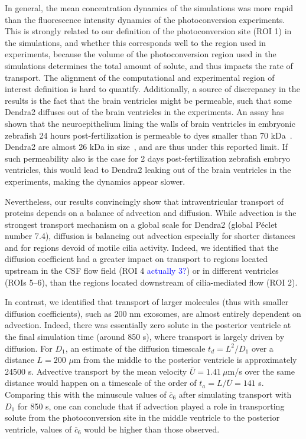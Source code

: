 \documentclass[fleqn]{wlscirep}
\newcommand{\cbar}{\overline{c}}
\newcommand{\lyng}[1]{\textcolor{blue}{#1}}
\begin{document}
In general, the mean concentration dynamics of the simulations was 
more rapid than the fluorescence intensity dynamics of the photoconversion experiments.
This is strongly related to our definition of the photoconversion site
(ROI 1) in the simulations, and whether this corresponds well to the
region used in experiments, because the volume of the photoconversion
region used in the simulations determines the total amount of solute,
and thus impacts the rate of transport. The alignment of the computational
and experimental region of interest definition is hard to quantify.
Additionally, a source of discrepancy in the results is the fact that the
brain ventricles might be permeable, such that some Dendra2 diffuses out
of the brain ventricles in the experiments. An assay has shown that the neuroepithelium
lining the walls of brain ventricles in embryonic zebrafish 24 hours post-fertilization
is permeable to dyes smaller than 70 kDa~\cite{Chang2012AnNeuroepithelium}.
Dendra2 are almost 26 kDa in size~\cite{Gurskaya2006EngineeringLight},
and are thus under this reported limit. If such permeability also is the case for 2 days
post-fertilization zebrafish embryo ventricles, this would lead to Dendra2 leaking
out of the brain ventricles in the experiments, making the dynamics appear slower. 

Nevertheless, our results convincingly show that intraventricular transport of proteins
depends on a balance of advection and diffusion. While advection is the strongest transport
mechanism on a global scale for Dendra2 (global Péclet number 7.4), diffusion is balancing out
advection especially for shorter distances and for regions devoid of motile cilia activity.
Indeed, we identified that the diffusion coefficient had a greater impact on transport to
regions located upstream in the CSF flow field (ROI 4\lyng{ actually 3?}) or in different ventricles (ROIs 5--6),
than the regions located downstream of cilia-mediated flow (ROI 2).

In contrast, we identified that transport of larger molecules
(thus with smaller diffusion coefficients),
such as 200 nm exosomes, are almost entirely dependent on advection.
Indeed, there was essentially zero solute in the posterior ventricle at the
final simulation time (around 850 s), where transport is largely driven by diffusion.
For $D_1$, an estimate of the diffusion timescale $t_d=L^2/D_1$ over a distance
$L=200$ $\mu$m from the middle to the posterior ventricle is approximately 24500 s.
Advective transport by the mean velocity $\overline{U}=1.41 \ \mu$m/s over the same distance would happen
on a timescale of the order of $t_a=L/\overline{U}=141$ s. Comparing this with the minuscule values of
$\cbar_6$ after simulating transport with $D_1$ for 850 s, one can conclude that if advection
played a role in transporting solute from the photoconversion site in the middle ventricle
to the posterior ventricle, values of $\cbar_6$ would be higher than those observed.
\end{document}
